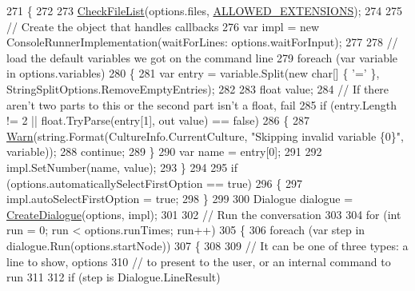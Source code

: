 \begin{DoxyCode}
271         \{
272 
273             \hyperlink{a00172_ad77564b25725a771f0fd4da430582e6f}{CheckFileList}(options.files, \hyperlink{a00172_a0979de7ea02c8c0375b8220a12e6575e}{ALLOWED\_EXTENSIONS});
274 
275             \textcolor{comment}{// Create the object that handles callbacks}
276             var impl = \textcolor{keyword}{new} ConsoleRunnerImplementation(waitForLines: options.waitForInput);
277 
278             \textcolor{comment}{// load the default variables we got on the command line}
279             \textcolor{keywordflow}{foreach} (var variable \textcolor{keywordflow}{in} options.variables)
280             \{
281                 var entry = variable.Split(\textcolor{keyword}{new} \textcolor{keywordtype}{char}[] \{ \textcolor{charliteral}{'='} \}, StringSplitOptions.RemoveEmptyEntries);
282 
283                 \textcolor{keywordtype}{float} value;
284                 \textcolor{comment}{// If there aren't two parts to this or the second part isn't a float, fail}
285                 \textcolor{keywordflow}{if} (entry.Length != 2 || \textcolor{keywordtype}{float}.TryParse(entry[1], out value) == \textcolor{keyword}{false})
286                 \{
287                     \hyperlink{a00172_a979bb6f049b6c5294f745a19e24ddd9d}{Warn}(\textcolor{keywordtype}{string}.Format(CultureInfo.CurrentCulture, \textcolor{stringliteral}{"Skipping invalid variable \{0\}"}, 
      variable));
288                     \textcolor{keywordflow}{continue};
289                 \}
290                 var name = entry[0];
291 
292                 impl.SetNumber(name, value);
293             \}
294 
295             \textcolor{keywordflow}{if} (options.automaticallySelectFirstOption == \textcolor{keyword}{true})
296             \{
297                 impl.autoSelectFirstOption = \textcolor{keyword}{true};
298             \}
299 
300             Dialogue dialogue = \hyperlink{a00172_aab244361a510cee18ad2f636d110e0d5}{CreateDialogue}(options, impl);
301 
302             \textcolor{comment}{// Run the conversation}
303 
304             \textcolor{keywordflow}{for} (\textcolor{keywordtype}{int} run = 0; run < options.runTimes; run++)
305             \{
306                 \textcolor{keywordflow}{foreach} (var step \textcolor{keywordflow}{in} dialogue.Run(options.startNode))
307                 \{
308 
309                     \textcolor{comment}{// It can be one of three types: a line to show, options}
310                     \textcolor{comment}{// to present to the user, or an internal command to run}
311 
312                     \textcolor{keywordflow}{if} (step is Dialogue.LineResult)

\end{DoxyCode}
